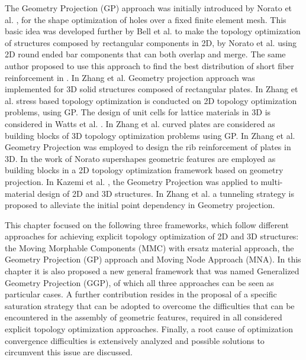 The Geometry Projection (GP) approach was initially introduced by Norato et al. \cite{norato2004geometry}, for the shape optimization of holes over a fixed finite element mesh. This basic idea was developed further by Bell et al. \cite{bell2012geometry} to make the topology optimization of structures composed by rectangular components in 2D, by Norato et al. \cite{norato2015geometryde} using 2D round ended bar components that can both overlap and merge. The same author proposed to use this approach to find the best distribution of short fiber reinforcement in \cite{norato2015geometry}. In Zhang et al. \cite{zhang2016geometry} Geometry projection approach was implemented for 3D solid structures composed of rectangular plates. In Zhang et al. \cite{zhang2017stress} stress based topology optimization is conducted on 2D topology optimization problems, using GP. The design of unit cells for lattice materials in 3D is considered in Watts et al. \cite{watts2017geometric}. In Zhang et al. \cite{zhang2018geometry} curved plates are considered as building blocks of 3D topology optimization problems using GP.
In Zhang et al. \cite{zhang2017optimal} Geometry Projection was employed to design the rib reinforcement of plates in 3D.
In the work of Norato \cite{norato2018topology} supershapes geometric features are employed as building blocks in a 2D topology optimization framework based on geometry projection. 
In Kazemi et al. \cite{kazemi2018topology}, the Geometry Projection was applied to multi-material design of 2D and 3D structures.  
In Zhang et al. \cite{zhang2018finding} a tunneling strategy is proposed to alleviate the initial point dependency in Geometry projection.

This chapter focused on the following three frameworks, which follow different approaches for achieving explicit topology optimization of 2D and 3D structures: the Moving Morphable Components (MMC) with ersatz material approach, the Geometry Projection (GP) approach and Moving Node Approach (MNA). In this chapter it is also proposed a new general framework that was named Generalized Geometry Projection (GGP), of which all three approaches can be seen as particular cases. A further contribution resides in the proposal of a specific saturation strategy that can be adopted to overcome the difficulties that can be encountered in the assembly of geometric features, required in all considered explicit topology optimization approaches. Finally, a root cause of optimization convergence difficulties is extensively analyzed and possible solutions to circumvent this issue are discussed.

